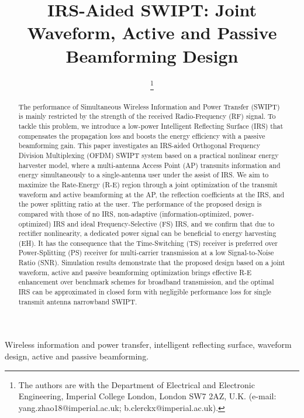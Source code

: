 \documentclass[journal]{IEEEtran}
\begin{document}
	\title{IRS-Aided SWIPT: Joint Waveform, Active and Passive Beamforming Design}
	\author{
		\thanks{
			The authors are with the Department of Electrical and Electronic Engineering, Imperial College London, London SW7 2AZ, U.K. (e-mail: yang.zhao18@imperial.ac.uk; b.clerckx@imperial.ac.uk).
		}
	}
	\maketitle


	\begin{abstract}
		The performance of Simultaneous Wireless Information and Power Transfer (SWIPT) is mainly restricted by the strength of the received Radio-Frequency (RF) signal. To tackle this problem, we introduce a low-power Intelligent Reflecting Surface (IRS) that compensates the propagation loss and boosts the energy efficiency with a passive beamforming gain. This paper investigates an IRS-aided Orthogonal Frequency Division Multiplexing (OFDM) SWIPT system based on a practical nonlinear energy harvester model, where a multi-antenna Access Point (AP) transmits information and energy simultaneously to a single-antenna user under the assist of IRS. We aim to maximize the Rate-Energy (R-E) region through a joint optimization of the transmit waveform and active beamforming at the AP, the reflection coefficients at the IRS, and the power splitting ratio at the user. The performance of the proposed design is compared with those of no IRS, non-adaptive (information-optimized, power-optimized) IRS and ideal Frequency-Selective (FS) IRS, and we confirm that due to rectifier nonlinearity, a dedicated power signal can be beneficial to energy harvesting (EH). It has the consequence that the Time-Switching (TS) receiver is preferred over Power-Splitting (PS) receiver for multi-carrier transmission at a low Signal-to-Noise Ratio (SNR). Simulation results demonstrate that the proposed design based on a joint waveform, active and passive beamforming optimization brings effective R-E enhancement over benchmark schemes for broadband transmission, and the optimal IRS can be approximated in closed form with negligible performance loss for single transmit antenna narrowband SWIPT.
	\end{abstract}


	\begin{IEEEkeywords}
		Wireless information and power transfer, intelligent reflecting surface, waveform design, active and passive beamforming.
	\end{IEEEkeywords}
\end{document}
